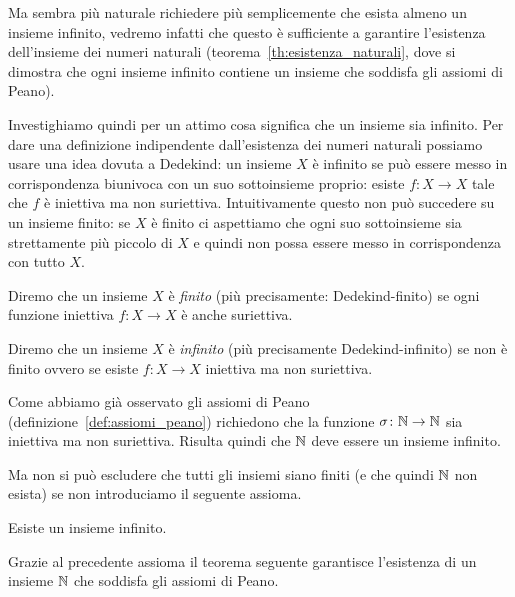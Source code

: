 Ma sembra più naturale richiedere più semplicemente che esista almeno un insieme infinito,
vedremo infatti che questo è sufficiente a garantire l'esistenza dell'insieme dei numeri naturali
(teorema~\ref{th:esistenza_naturali}, dove si dimostra che ogni insieme infinito contiene un insieme 
che soddisfa gli assiomi di Peano).

Investighiamo quindi per un attimo cosa significa che un insieme sia infinito.
Per dare una definizione indipendente dall'esistenza dei numeri naturali possiamo usare 
una idea dovuta a Dedekind:
un insieme $X$ è infinito se può essere messo in corrispondenza 
biunivoca con un suo sottoinsieme proprio: 
esiste $f\colon X\to X$ tale che $f$ è iniettiva ma non suriettiva. 
Intuitivamente questo non può succedere su un insieme finito: 
se $X$ è finito ci aspettiamo che ogni suo sottoinsieme sia strettamente più piccolo di $X$
e quindi non possa essere messo in corrispondenza con tutto $X$.

\begin{definition}
  \label{def:infinito}%
  Diremo che un insieme $X$ è \emph{finito}
  (più precisamente: Dedekind-finito)
  se ogni funzione iniettiva $f\colon X\to X$ è anche suriettiva.
%

  Diremo che un insieme $X$ è \emph{infinito} 
  (più precisamente Dedekind-infinito)
  se non è finito ovvero
  se esiste $f\colon X\to X$ iniettiva ma non suriettiva.
%
\end{definition}

Come abbiamo già osservato gli assiomi di Peano (definizione~\ref{def:assiomi_peano}) 
richiedono che la funzione $\sigma\colon {\mathbb N}\to{\mathbb N}$ sia iniettiva ma non suriettiva.
Risulta quindi che ${\mathbb N}$ deve essere un insieme infinito.

Ma non si può escludere che tutti gli insiemi siano finiti (e che quindi ${\mathbb N}$ non esista) 
se non introduciamo il seguente assioma.

\begin{axiom}[infinito]
  \label{axiom:infinito}%
  Esiste un insieme infinito. 
\end{axiom}

Grazie al precedente assioma il teorema seguente garantisce
l'esistenza di un insieme ${\mathbb N}$ che soddisfa gli assiomi di Peano.

